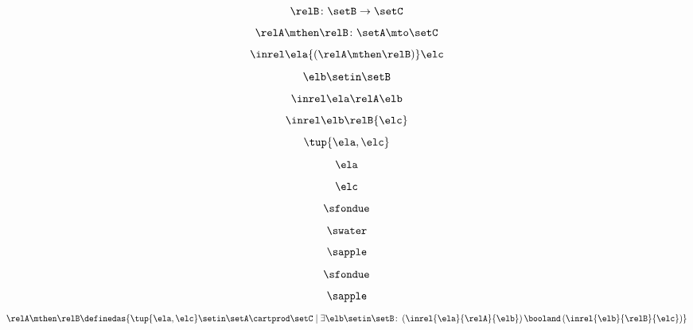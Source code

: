 \begin{forslides}
\begin{equation}\label{eq:slides_session2_84}
\relB \colon \setB \to \setC
\end{equation}
 \begin{equation}\label{eq:slides_session2_85}
\relA \mthen \relB \colon \setA \mto \setC
\end{equation}
\begin{equation}\label{eq:slides_session2_86}
\inrel \ela {(\relA \mthen \relB)} \elc
\end{equation}
 \begin{equation}\label{eq:slides_session2_87}
\elb \setin \setB
\end{equation}
\begin{equation}\label{eq:slides_session2_88}
\inrel \ela \relA \elb 
\end{equation}
 \begin{equation}\label{eq:slides_session2_89}
\inrel \elb \relB{\elc}
\end{equation}
\begin{equation}\label{eq:slides_session2_90}
\tup{\ela,\elc}
\end{equation}
 \begin{equation}\label{eq:slides_session2_91}
\ela
\end{equation}
\begin{equation}\label{eq:slides_session2_92}
\elc
\end{equation}
 \begin{equation}\label{eq:slides_session2_93}
\sfondue
\end{equation}
\begin{equation}\label{eq:slides_session2_94}
\swater
\end{equation}
 \begin{equation}\label{eq:slides_session2_95}
\sapple
\end{equation}
\begin{equation}\label{eq:slides_session2_96}
\sfondue
\end{equation}
 \begin{equation}\label{eq:slides_session2_97}
\sapple
\end{equation}
\begin{equation}\label{eq:slides_session2_98}
 \relA \mthen \relB \definedas \{\tup{\ela,\elc} \setin \setA \cartprod \setC \mid  \exists \elb \setin \setB \colon \left(\inrel{\ela}{\relA}{\elb} \right) \booland \left(\inrel{\elb}{\relB}{\elc}\right)\}
\end{equation}


\end{forslides}
